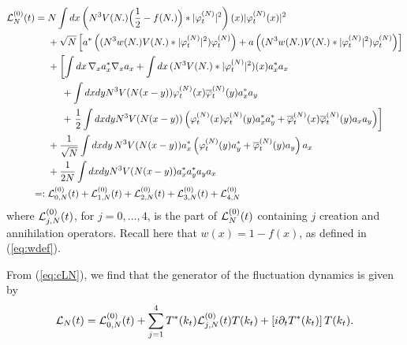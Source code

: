 \documentclass[11pt,a4paper]{article}
\newcommand{\done}{}
\newcommand{\cL}{{\cal L}}
\newcommand{\di}{{d}}		%
\newcommand{\ph}{\varphi_t^{(N)}}	%
\begin{document}
\[ \begin{split} \cL_N^{(0)} (t) = \; & %
N \int \di x\left( N^3 V(N.)\Big(\frac{1}{2}-f(N.)\Big)\ast \lvert \ph\rvert^2 \right)(x) \lvert \ph(x)\rvert^2 \done\\
&+ \sqrt{N}  \left[  a^*\left( (N^3
w(N.) V (N.) *| \varphi_t^{(N)}|^2) \varphi_t^{(N)} \right)
+ a\left( (N^3 w (N.)V (N.) *| \varphi_t^{(N)}|^2) \varphi_t^{(N)} \right) \right] \\
&+ \left[ \int dx \, \nabla_x a_x^* \nabla_x a_x + \int dx \, (N^3 V (N.) * |\varphi_t^{(N)}|^2) (x) a_x^* a_x \right. \\ 
&\hspace{.5cm}+ \int dx dy N^3 V(N (x-y)) \varphi_t^{(N)} (x) \overline{\varphi}_t^{(N)} (y) a_x^* a_y \\
&\hspace{.5cm}+ \left.  \frac{1}{2} \int dx dy N^3 V(N (x-y)) \left( \varphi_t^{(N)} (x) \varphi_t^{(N)} (y) a_x^* a_y^* + 
\overline{\varphi}_t^{(N)} (x) \overline{\varphi}_t^{(N)} (y) a_x a_y \right) \right] \\
&+ \frac{1}{\sqrt{N}}  \int dx dy \, N^3 V(N(x-y)) a_x^* \left( \varphi_t^{(N)} (y) a_y^* + \overline{\varphi}_t^{(N)} (y) a_y \right) a_x \\
&+\frac{1}{2N} \int dx dy N^3 V(N (x-y)) a_x^* a_y^* a_y a_x \\
=: \; & \cL_{0,N}^{(0)} (t) + \cL_{1,N}^{(0)} (t) + \cL_{2,N}^{(0)} (t) +  
\cL_{3,N}^{(0)} (t) + \cL_{4,N}^{(0)} 
\end{split} \]
where $\cL^{(0)}_{j,N} (t)$, for $j=0, \dots , 4$, is the part of $\cL_N^{(0)} (t)$ containing $j$ creation and annihilation operators. Recall here that $w (x) = 1 - f (x)$, as defined in (\ref{eq:wdef}). 

{F}rom (\ref{eq:cLN}), we find that the generator of the fluctuation dynamics is given by
\begin{equation}\label{eq:dec-cLN} \cL_N (t) =  \cL_{0,N}^{(0)} (t) +
\sum_{j=1}^4 T^* (k_t) \cL_{j,N}^{(0)} (t) T (k_t) +\left[ i \partial_t T^*
(k_t) \right] T(k_t). \end{equation}
\end{document}
